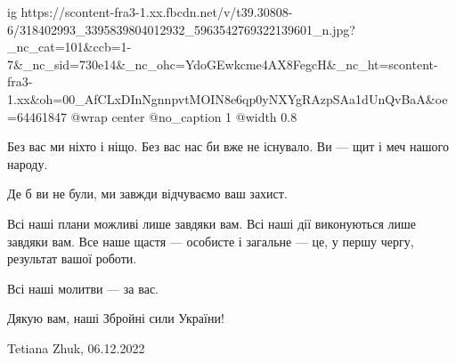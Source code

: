  
 
 
 
 

\clearpage

\ifcmt
  ig https://scontent-fra3-1.xx.fbcdn.net/v/t39.30808-6/318402993_3395839804012932_5963542769322139601_n.jpg?_nc_cat=101&ccb=1-7&_nc_sid=730e14&_nc_ohc=YdoGEwkcme4AX8FegcH&_nc_ht=scontent-fra3-1.xx&oh=00_AfCLxDInNgnnpvtMOIN8e6qp0yNXYgRAzpSAa1dUnQvBaA&oe=64461847
  @wrap center
	@no_caption 1
  @width 0.8
\fi

\large

Без вас ми ніхто і ніщо. Без вас нас би вже не існувало. Ви — щит і меч нашого
народу.
\par\vspace{0.5cm}

Де б ви не були, ми завжди відчуваємо ваш захист.
\par\vspace{0.5cm}

Всі наші плани можливі лише завдяки вам. Всі наші дії виконуються лише завдяки
вам. Все наше щастя — особисте і загальне — це, у першу чергу, результат вашої
роботи.
\par\vspace{0.5cm}

Всі наші молитви — за вас.
\par\vspace{0.5cm}

Дякую вам, наші Збройні сили України!
\par\vspace{1cm}

Tetiana Zhuk, 06.12.2022
